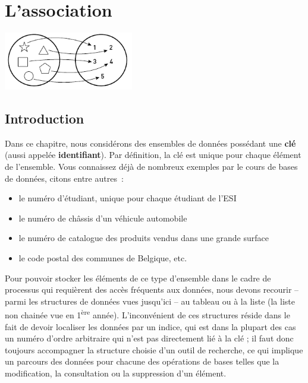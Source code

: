 \chapter{L'association}

\begin{center}
	\includegraphics[width=5.66cm,height=2.536cm]{image/a2012Logique2eme-img014.png}
\end{center}
	

\section{Introduction}
	
	Dans ce chapitre, nous considérons des ensembles de données 
	possédant une \textbf{clé} (aussi appelée \textbf{identifiant}). 
	Par définition, la clé est unique pour chaque élément de l'ensemble. 
	Vous connaissez déjà de nombreux exemples par le cours de 
	bases de données, citons entre autres~:

	\begin{itemize}
		\item {
			le numéro d'étudiant, unique pour chaque étudiant de l'ESI}
		\item {
			le numéro de châssis d'un véhicule automobile}
		\item {
			le numéro de catalogue des produits vendus dans une grande surface}
		\item {
			le code postal des communes de Belgique, etc.}
	\end{itemize}

	Pour pouvoir stocker les éléments de ce type d'ensemble 
	dans le cadre de processus qui requièrent des accès fréquents
	aux données, nous devons recourir -- parmi les structures de 
	données vues jusqu'ici -- au tableau ou à la liste (la
	liste non chainée vue en 1\textsuperscript{ère} année). 
	L'inconvénient de ces structures réside dans le fait de devoir
	localiser les données par un indice, qui est dans la plupart 
	des cas un numéro d'ordre arbitraire qui n'est pas
	directement lié à la clé ; il faut donc toujours accompagner 
	la structure choisie d'un outil de recherche, ce qui
	implique un parcours des données pour chacune des opérations 
	de bases telles que la modification, la consultation ou la
	suppression d'un élément.

